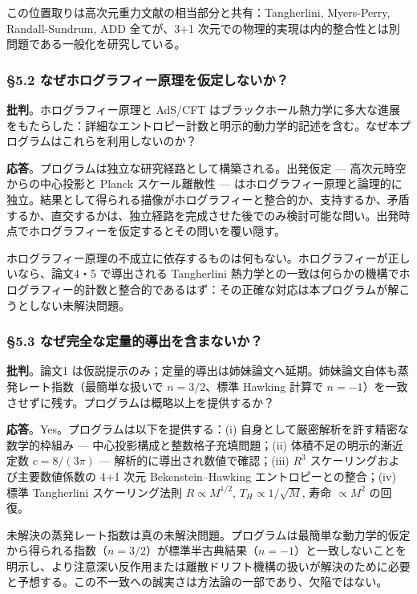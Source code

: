 \documentclass[a4paper,11pt]{ltjsarticle}
\theoremstyle{definition}
\begin{document}
この位置取りは高次元重力文献の相当部分と共有：Tangherlini, Myers-Perry,
Randall-Sundrum, ADD 全てが、3+1
次元での物理的実現は内的整合性とは別問題である一般化を研究している。

\subsubsection{§5.2
なぜホログラフィー原理を仮定しないか？}\label{ux306aux305cux30dbux30edux30b0ux30e9ux30d5ux30a3ux30fcux539fux7406ux3092ux4eeeux5b9aux3057ux306aux3044ux304b}

\textbf{批判}。ホログラフィー原理と AdS/CFT
はブラックホール熱力学に多大な進展をもたらした：詳細なエントロピー計数と明示的動力学的記述を含む。なぜ本プログラムはこれらを利用しないのか？

\textbf{応答}。プログラムは独立な研究経路として構築される。出発仮定 ---
高次元時空からの中心投影と Planck スケール離散性 ---
はホログラフィー原理と論理的に独立。結果として得られる描像がホログラフィーと整合的か、支持するか、矛盾するか、直交するかは、独立経路を完成させた後でのみ検討可能な問い。出発時点でホログラフィーを仮定するとその問いを覆い隠す。

ホログラフィー原理の不成立に依存するものは何もない。ホログラフィーが正しいなら、論文4・5
で導出される Tangherlini
熱力学との一致は何らかの機構でホログラフィー的計数と整合的であるはず：その正確な対応は本プログラムが解こうとしない未解決問題。

\subsubsection{§5.3
なぜ完全な定量的導出を含まないか？}\label{ux306aux305cux5b8cux5168ux306aux5b9aux91cfux7684ux5c0eux51faux3092ux542bux307eux306aux3044ux304b}

\textbf{批判}。論文1
は仮説提示のみ；定量的導出は姉妹論文へ延期。姉妹論文自体も蒸発レート指数（最簡単な扱いで
\(n = 3/2\)、標準 Hawking 計算で
\(n = -1\)）を一致させずに残す。プログラムは概略以上を提供するか？

\textbf{応答}。Yes。プログラムは以下を提供する：(i)
自身として厳密解析を許す精密な数学的枠組み ---
中心投影構成と整数格子充填問題；(ii) 体積不足の明示的漸近定数
\(c = 8/(3\pi)\) --- 解析的に導出され数値で確認；(iii) \(R^3\)
スケーリングおよび主要数値係数の 4+1 次元 Bekenstein--Hawking
エントロピーとの整合；(iv) 標準 Tangherlini スケーリング法則
\(R \propto M^{1/2}\), \(T_H \propto 1/\sqrt{M}\), 寿命 \(\propto M^2\)
の回復。

未解決の蒸発レート指数は真の未解決問題。プログラムは最簡単な動力学的仮定から得られる指数（\(n = 3/2\)）が標準半古典結果（\(n = -1\)）と一致しないことを明示し、より注意深い反作用または離散ドリフト機構の扱いが解決のために必要と予想する。この不一致への誠実さは方法論の一部であり、欠陥ではない。
\end{document}
